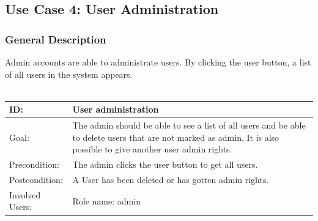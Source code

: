 \documentclass[12pt]{article}
\theoremstyle{definition}
\begin{document}
\subsection{Use Case 4: User Administration}
\subsubsection{General Description}
Admin accounts are able to administrate users. By clicking the user button, a list of all users in the system appears.\\
\\
\begin{tabular}{|p{.2\linewidth}|p{.65\linewidth}|}
\hline 
ID: & User administration\\ \hline
Goal: & The admin should be able to see a list of all users and be able to delete users that are not marked as admin. It is also possible to give another user admin rights.\\ \hline
Precondition: & The admin clicks the user button to get all users.\\ \hline
Postcondition: & A User has been deleted or has gotten admin rights.\\ \hline
Involved Users: & Role name: admin  \\ \hline
\end{tabular}
\end{document}

